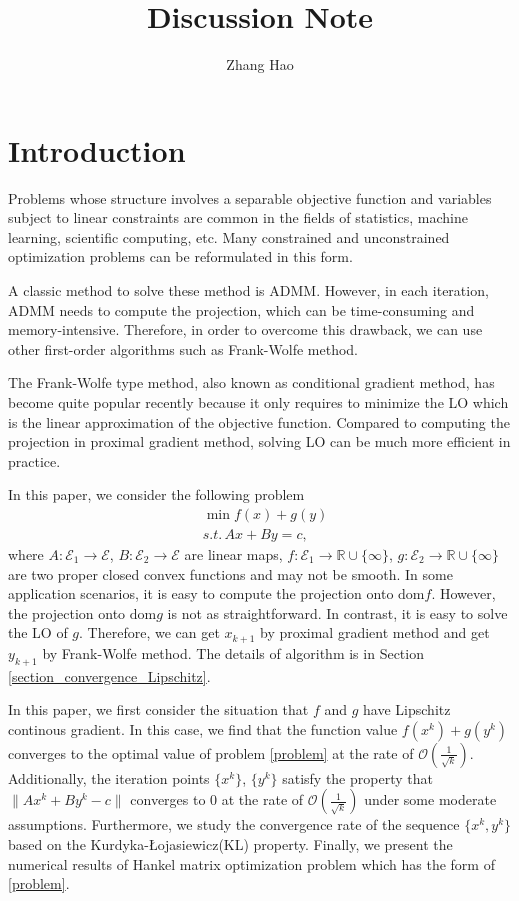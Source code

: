 \documentclass{article}
\title{Discussion Note}
\author{Zhang Hao}
\numberwithin{equation}{section}
\begin{document}
\maketitle


\section{Introduction }
Problems whose structure involves a separable objective function and variables subject to linear constraints are
common in the fields of statistics, machine learning, scientific computing, etc. Many constrained and unconstrained
optimization problems can be reformulated in this form. 

A classic method to solve these method is ADMM. However, in each iteration, ADMM needs to compute the projection, 
which can be time-consuming and memory-intensive. Therefore, in order to overcome this drawback, we can use other first-order
algorithms such as Frank-Wolfe method.

The Frank-Wolfe type method, also known as conditional gradient method, has become quite popular recently because it only requires to minimize the LO which is the linear approximation of the
objective function. Compared to computing the projection in proximal gradient method, solving LO can be much more
efficient in practice.

In this paper, we consider the following problem
\begin{align} \label{problem}
    &\min f(x)+g(y) \nonumber  \\
    &s.t.\hspace{2pt} Ax+By=c, 
\end{align}
where $A: \mathcal{E}_1 \rightarrow \mathcal{E}$, $B: \mathcal{E}_2 \rightarrow \mathcal{E}$ are linear maps, 
$f: \mathcal{E}_1 \rightarrow \mathbb{R}\cup\{\infty\}$, 
$g: \mathcal{E}_2 \rightarrow \mathbb{R}\cup\{\infty\}$ are two proper closed convex functions 
and may not be smooth. In some application scenarios, it is easy to compute the projection onto $\mathrm{dom} f$. However, the projection onto $\mathrm{dom} g$ is not as straightforward. In contrast, 
it is easy to solve the LO of $g$. Therefore, we can get $x_{k+1}$ by proximal gradient method and get $y_{k+1}$ by Frank-Wolfe
method.  The details of algorithm is in Section \ref{section_convergence_Lipschitz}.

In this paper, we first consider the situation that $f$ and $g$ have Lipschitz continous gradient. In this case, 
we find that the function value $f(x^k)+ g(y^k)$ converges to the optimal value of problem \eqref{problem}
at the rate of $\mathcal{O}\left( \frac{1}{\sqrt{k}} \right)$. Additionally, the iteration points $\{x^k\}$, $\{y^k\}$ 
satisfy the property that $\|Ax^k+By^k-c\rVert$  converges to 0 at the rate of $\mathcal{O}\left(\frac{1}{\sqrt{k}}\right)$ 
under some moderate assumptions. 
Furthermore, we study the convergence rate of the sequence $\{x^k,y^k\}$ based on the 
Kurdyka-\L{}ojasiewicz(KL) property. Finally, we present the numerical results of Hankel matrix optimization
problem which has the form of \eqref{problem}.  
\end{document}
